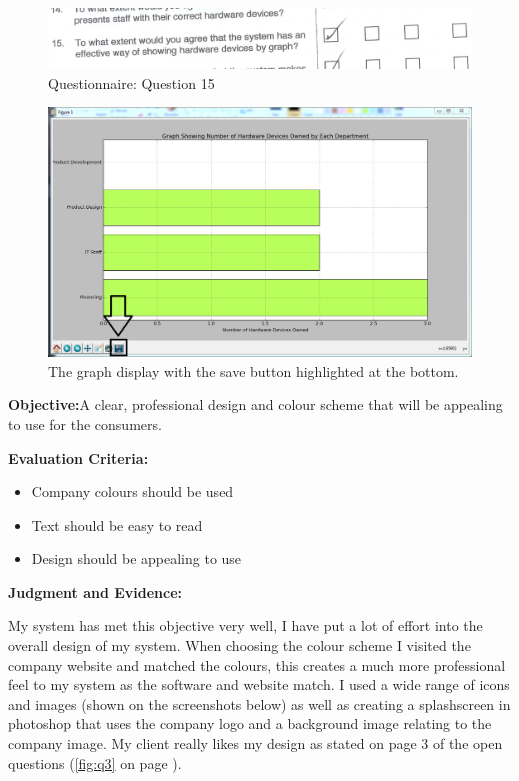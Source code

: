 \begin{figure}[H]
    \includegraphics[width=\textwidth]{./Evaluation/EvaluationQuestionnaire/15.png}
    \caption{Questionnaire: Question 15} 
\end{figure}

\begin{figure}[H]
    \includegraphics[width=\textwidth]{./Manual/Images/graph2.png}
    \caption{The graph display with the save button highlighted at the bottom.} 
\end{figure}

\textbf{Objective:}A clear, professional design and colour scheme that will be appealing to use for the consumers.

\textbf{Evaluation Criteria:}
\begin{itemize}
\item{Company colours should be used}
\item{Text should be easy to read}
\item{Design should be appealing to use}
\end{itemize}

\textbf{Judgment and Evidence:}

My system has met this objective very well, I have put a lot of effort into the overall design of my system. When choosing the colour scheme I visited the company website and matched the colours, this creates a much more professional feel to my system as the software and website match. I used a wide range of icons and images (shown on the screenshots below) as well as creating a splashscreen in photoshop that uses the company logo and a background image relating to the company image. My client really likes my design as stated on page 3 of the open questions (\ref{fig:q3} on page \pageref{fig:q3}).

